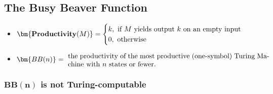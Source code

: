 \documentclass[12pt]{extarticle}
\begin{document}
\subsection{The Busy Beaver Function}


\begin{itemize}
\item $\bm{\text{\textbf{Productivity}}(M)} = \begin{cases} k,  \text{ if $M$ yields output $k$ on an empty input} \\ 0, \text{ otherwise}\end{cases}$

\item $\bm{BB(n)} = \ \mbox{\parbox{100mm}{the productivity of the most productive (one-symbol) Turing Machine with \(n\) states or fewer.}}$

\end{itemize}



\subsubsection{$\bm{BB(n)}$ is not Turing-computable}
\end{document}
